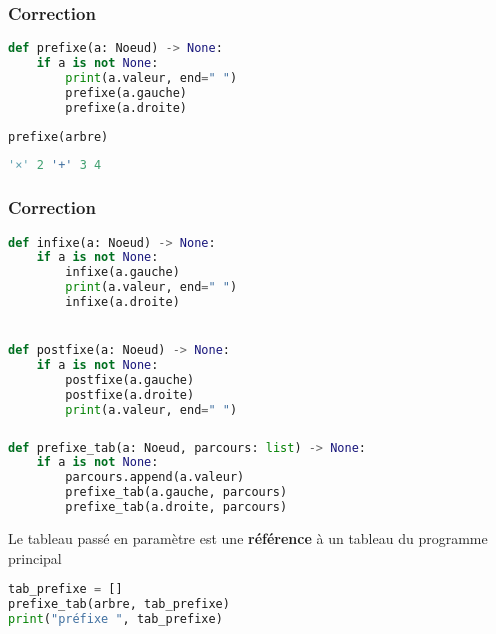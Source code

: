 \documentclass[svgnames,11pt]{beamer}
\begin{document}
\begin{frame}[fragile]
    \frametitle{Correction}

\begin{center}
\begin{lstlisting}[language=Python , basicstyle=\ttfamily\small, xleftmargin=1em, xrightmargin=1em]
def prefixe(a: Noeud) -> None:
    if a is not None:
        print(a.valeur, end=" ")
        prefixe(a.gauche)
        prefixe(a.droite)
\end{lstlisting}
\end{center}    
\begin{lstlisting}[language=Python , basicstyle=\ttfamily\small, xleftmargin=1em, xrightmargin=1em]
prefixe(arbre)
\end{lstlisting}
\begin{lstlisting}[language=Python , basicstyle=\ttfamily\small, xleftmargin=1em, xrightmargin=1em]
'×' 2 '+' 3 4
\end{lstlisting}
\end{frame}
\begin{frame}[fragile]
    \frametitle{Correction}

\begin{center}
\begin{lstlisting}[language=Python , basicstyle=\ttfamily\small, xleftmargin=1em, xrightmargin=1em]
def infixe(a: Noeud) -> None:
    if a is not None:
        infixe(a.gauche)
        print(a.valeur, end=" ")
        infixe(a.droite)


def postfixe(a: Noeud) -> None:
    if a is not None:
        postfixe(a.gauche)
        postfixe(a.droite)
        print(a.valeur, end=" ")
\end{lstlisting}
\end{center}    

\end{frame}
\begin{frame}[fragile]
    \frametitle{}

\begin{center}
\begin{lstlisting}[language=Python , basicstyle=\ttfamily\small, xleftmargin=.5em, xrightmargin=0em]
def prefixe_tab(a: Noeud, parcours: list) -> None:
    if a is not None:
        parcours.append(a.valeur)
        prefixe_tab(a.gauche, parcours)
        prefixe_tab(a.droite, parcours)
\end{lstlisting}
\end{center}
\begin{aretenir}[Remarque]
Le tableau passé en paramètre est une \textbf{référence} à un tableau du programme principal
\end{aretenir}
\begin{center}
\begin{lstlisting}[language=Python , basicstyle=\ttfamily\small, xleftmargin=2em, xrightmargin=2em]
tab_prefixe = []
prefixe_tab(arbre, tab_prefixe)
print("préfixe ", tab_prefixe)
\end{lstlisting}
\label{CODE}
\end{center}
\end{frame}
\end{document}
